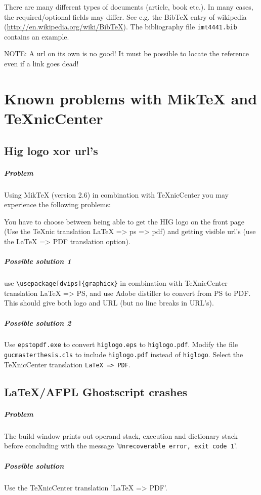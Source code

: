 \documentclass[informationsecurity]{gucmasterproject}
\begin{document}
There are many different types of documents (article, book etc.).
In many cases, the required/optional fields may differ.
See e.g. the BibTeX entry of wikipedia (\url{http://en.wikipedia.org/wiki/BibTeX}).
The bibliography file 
\verb+imt4441.bib+ 
contains an example.

NOTE: A url on its own is no good!
It must be possible to locate the reference even if a link goes dead!

\appendix
\chapter{Known problems with MikTeX and TeXnicCenter}
\section{Hig logo xor url's}
\paragraph{Problem}
Using MikTeX (version 2.6) in combination with TeXnicCenter you may experience the following problems:

You have to choose between being able to get the HIG logo on the front page (Use the TeXnic translation LaTeX => ps => pdf)  and getting visible url's (use the LaTeX => PDF translation option).

\paragraph{Possible solution 1}
use \verb+\usepackage[dvips]{graphicx}+ in combination with TeXnicCenter translation LaTeX => PS, and use Adobe distiller to convert from PS to PDF.  This should give both logo and URL (but no line breaks in URL's).

\paragraph{Possible solution 2}
Use \verb+epstopdf.exe+ to convert \verb+higlogo.eps+ to \verb+higlogo.pdf+.
Modify the file \verb+gucmasterthesis.cls+ to include \verb+higlogo.pdf+ instead of \verb+higlogo+.
Select the TeXnicCenter translation \verb+LaTeX => PDF+.


\section{\LaTeX/AFPL Ghostscript crashes}
\paragraph{Problem}
The build window prints out operand stack, execution and dictionary stack before concluding with the message 
'\verb+Unrecoverable error, exit code 1+'.
\paragraph{Possible solution}
Use the TeXnicCenter translation 'LaTeX => PDF'.




%

\end{document}
